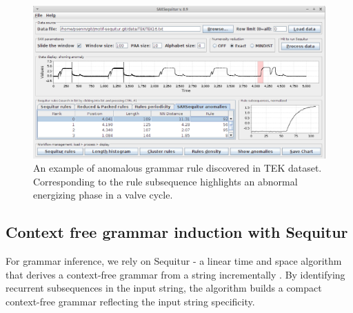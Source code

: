 \documentclass{llncs}
\begin{document}
\begin{figure}[t]
   \vspace{-0.8cm}
   \centering
   \includegraphics[width=120mm]{Figure2_TEK16_R92.eps}
   \caption{An example of anomalous grammar rule discovered in TEK dataset. Corresponding to the rule subsequence highlights an abnormal energizing phase in a valve cycle.}
   \label{fig2}
   \vspace{-0.4cm}
\end{figure}

\subsection{Context free grammar induction with Sequitur}
For grammar inference, we rely on Sequitur - a linear time and space algorithm that derives a context-free grammar from a string incrementally \cite{sequitur}. By identifying recurrent subsequences in the input string, the algorithm builds a compact context-free grammar reflecting the input string specificity. 
\end{document}
